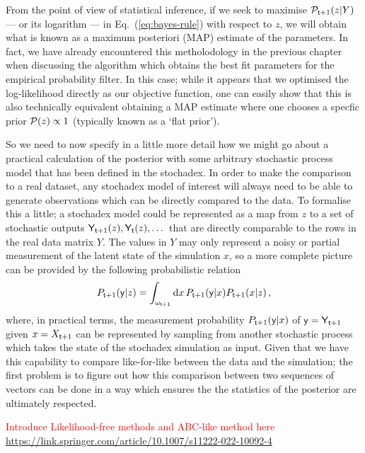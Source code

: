 From the point of view of statistical inference, if we seek to maximise ${\cal P}_{{\sf t}+1}(z \vert Y)$ --- or its logarithm --- in Eq.~(\ref{eq:bayes-rule}) with respect to $z$, we will obtain what is known as a maximum posteriori (MAP) estimate of the parameters. In fact, we have already encountered this metholodology in the previous chapter when discussing the algorithm which obtains the best fit parameters for the empirical probability filter. In this case; while it appears that we optimised the log-likelihood directly as our objective function, one can easily show that this is also technically equivalent obtaining a MAP estimate where one chooses a specfic prior ${\cal P} (z) \propto 1$ (typically known as a `flat prior').

So we need to now specify in a little more detail how we might go about a practical calculation of the posterior with some arbitrary stochastic process model that has been defined in the stochadex. In order to make the comparison to a real dataset, any stochadex model of interest will always need to be able to generate observations which can be directly compared to the data. To formalise this a little; a stochadex model could be represented as a map from $z$ to a set of stochastic outputs ${\sf Y}_{{\sf t}+1}(z), {\sf Y}_{{\sf t}}(z), \dots$ that are directly comparable to the rows in the real data matrix $Y$. The values in $Y$ may only represent a noisy or partial measurement of the latent state of the simulation $x$, so a more complete picture can be provided by the following probabilistic relation
\begin{align}
P_{{\sf t}+1}({\sf y} \vert z) = \int_{\omega_{{\sf t}+1}}{\rm d}x\, P_{{\sf t}+1}({\sf y} \vert x)P_{{\sf t}+1}(x\vert z) \,,
\end{align}
where, in practical terms, the measurement probability $P_{{\sf t}+1}({\sf y} \vert x)$ of ${\sf y}={\sf Y}_{{\sf t}+1}$ given $x=X_{{\sf t}+1}$ can be represented by sampling from another stochastic process which takes the state of the stochadex simulation as input. Given that we have this capability to compare like-for-like between the data and the simulation; the first problem is to figure out how this comparison between two sequences of vectors can be done in a way which ensures the the statistics of the posterior are ultimately respected. 

\textcolor{red}{Introduce Likelihood-free methods and ABC-like method here \url{https://link.springer.com/article/10.1007/s11222-022-10092-4}}

